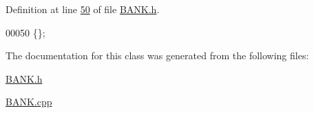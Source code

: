 Definition at line \hyperlink{_b_a_n_k_8h_source_l00050}{50} of file \hyperlink{_b_a_n_k_8h_source}{B\+A\+N\+K.\+h}.


\begin{DoxyCode}
00050 \{\};
\end{DoxyCode}


The documentation for this class was generated from the following files\+:\begin{DoxyCompactItemize}
\item 
\hyperlink{_b_a_n_k_8h}{B\+A\+N\+K.\+h}\item 
\hyperlink{_b_a_n_k_8cpp}{B\+A\+N\+K.\+cpp}\end{DoxyCompactItemize}
